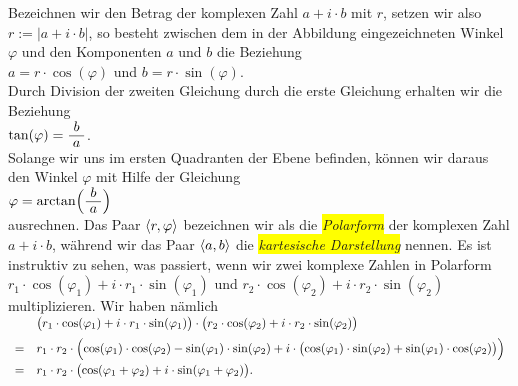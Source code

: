 \vspace*{0.2cm}
\noindent
Bezeichnen wir den Betrag der komplexen Zahl $a + i \cdot b$ mit $r$, setzen wir also 
$r := |a + i \cdot b|$, so besteht zwischen dem in der Abbildung eingezeichneten Winkel $\varphi$
und den Komponenten $a$ und 
$b$ die Beziehung
\\[0.2cm]
\hspace*{1.3cm} $a = r \cdot \cos(\varphi)$ \quad und \quad $b = r \cdot \sin(\varphi)$.
\\[0.2cm]
Durch Division der zweiten Gleichung durch die erste Gleichung erhalten wir die Beziehung
\\[0.2cm]
\hspace*{1.3cm} $\tan(\varphi) = \bruch{b}{a}$.
\\[0.2cm]
Solange wir uns im ersten Quadranten der Ebene befinden, k\"{o}nnen wir daraus den Winkel $\varphi$ mit Hilfe
der Gleichung
\\[0.2cm]
\hspace*{1.3cm} $\varphi = \arctan\Bigl(\bruch{b}{a}\Bigr)$
\\[0.2cm]
ausrechnen.  Das Paar $\pair(r, \varphi)$ bezeichnen wir als die \colorbox{yellow}{\emph{Polarform}} der
komplexen Zahl $a + i \cdot b$, w\"{a}hrend wir das Paar $\pair(a,b)$ die \colorbox{yellow}{\emph{kartesische Darstellung}}
nennen.  Es ist instruktiv zu sehen, was passiert, wenn wir zwei
komplexe Zahlen in Polarform
\\[0.2cm]
\hspace*{1.3cm} 
$r_1 \cdot \cos(\varphi_1) + i \cdot r_1 \cdot \sin(\varphi_1)$ \quad und \quad
$r_2 \cdot \cos(\varphi_2) + i \cdot r_2 \cdot \sin(\varphi_2)$ 
\\[0.2cm]
multiplizieren.  Wir haben n\"{a}mlich
\\[0.2cm]
$
\begin{array}[t]{cl}
  & \bigl(r_1 \cdot \cos(\varphi_1) + i \cdot r_1 \cdot \sin(\varphi_1)\bigr) \cdot
    \bigl(r_2 \cdot \cos(\varphi_2) + i \cdot r_2 \cdot \sin(\varphi_2)\bigr)       \\[0.2cm]
= & r_1 \cdot r_2 \cdot
    \Bigl(\cos(\varphi_1) \cdot \cos(\varphi_2) - \sin(\varphi_1) \cdot \sin(\varphi_2) +
          i \cdot \bigl(\cos(\varphi_1) \cdot \sin(\varphi_2) + \sin(\varphi_1) \cdot \cos(\varphi_2)\bigr)
    \Bigr) \\[0.2cm]
= & r_1 \cdot r_2 \cdot
    \bigl(\cos(\varphi_1 + \varphi_2) + i \cdot \sin(\varphi_1 + \varphi_2) \bigr).
\end{array}
$
\\[0.2cm]
